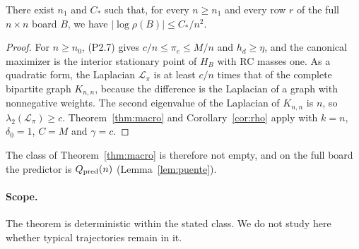 \begin{corolario}\label{cor:completo}
There exist $n_1$ and $C_*$ such that, for every $n\ge n_1$ and every row $r$ of the full $n\times n$
board $B$, we have $|\log\rho(B)|\le C_*/n^2$.
\end{corolario}
\begin{proof}
For $n\ge n_0$, (P2.7) gives $c/n\le\pi_e\le M/n$ and $h_d\ge\eta$, and the canonical maximizer is the
interior stationary point of $H_B$ with RC masses one. As a quadratic form, the Laplacian $\mathscr L_\pi$
is at least $c/n$ times that of the complete bipartite graph $K_{n,n}$, because the difference is the
Laplacian of a graph with nonnegative weights. The second eigenvalue of the Laplacian of $K_{n,n}$ is
$n$, so $\lambda_2(\mathscr L_\pi)\ge c$. Theorem~\ref{thm:macro} and Corollary~\ref{cor:rho} apply with
$k=n$, $\delta_0=1$, $C=M$ and $\gamma=c$.
\end{proof}
The class of Theorem~\ref{thm:macro} is therefore not empty, and on the full board the predictor is
$Q_{\rm pred}(n)$ (Lemma~\ref{lem:puente}).

\paragraph{Scope.}
The theorem is deterministic within the stated class. We do not study here whether typical trajectories
remain in it.
